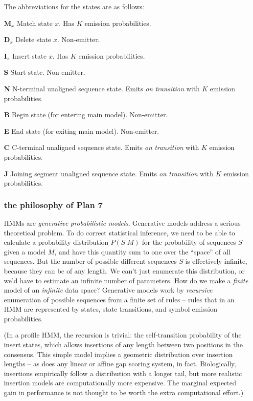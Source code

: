 The abbreviations for the states are as follows:

\begin{wideitem}
\item [\textbf{M$_x$}] Match state $x$.  Has $K$ emission probabilities.
\item [\textbf{D$_x$}] Delete state $x$. Non-emitter.
\item [\textbf{I$_x$}] Insert state $x$. Has $K$ emission probabilities.
\item [\textbf{S}]     Start state. Non-emitter.
\item [\textbf{N}]     N-terminal unaligned sequence state. 
    Emits \textit{on transition} with $K$ emission probabilities.
\item [\textbf{B}]     Begin state (for entering main model). Non-emitter.
\item [\textbf{E}]     End state (for exiting main model). Non-emitter.
\item [\textbf{C}]     C-terminal unaligned sequence state.
    Emits \textit{on transition} with $K$ emission probabilities.
\item [\textbf{J}]     Joining segment unaligned sequence state.
    Emits \textit{on transition} with $K$ emission probabilities.
\end{wideitem}

\subsubsection{the philosophy of Plan 7}

HMMs are \emph{generative probabilistic models}. Generative models
address a serious theoretical problem. To do correct statistical
inference, we need to be able to calculate a probability distribution
$P(S | M)$ for the probability of sequences $S$ given a model $M$, and
have this quantity sum to one over the ``space'' of all sequences.
But the number of possible different sequences $S$ is effectively
infinite, because they can be of any length. We can't just enumerate
this distribution, or we'd have to estimate an infinite number of
parameters. How do we make a \emph{finite} model of an \emph{infinite}
data space?  Generative models work by \emph{recursive} enumeration of
possible sequences from a finite set of rules -- rules that in an HMM
are represented by states, state transitions, and symbol emission
probabilities.

(In a profile HMM, the recursion is trivial: the self-transition
probability of the insert states, which allows insertions of any
length between two positions in the consensus. This simple model
implies a geometric distribution over insertion lengths -- as does any
linear or affine gap scoring system, in fact. Biologically, insertions
empirically follow a distribution with a longer tail, but more
realistic insertion models are computationally more expensive. The
marginal expected gain in performance is not thought to be worth the
extra computational effort.)

